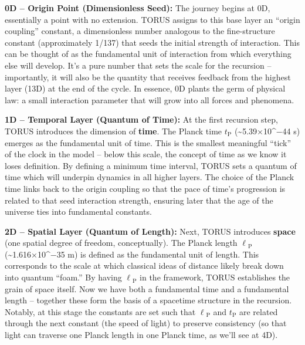 \documentclass[]{article}
\newcommand{\subscript}[1]{\ensuremath{_{\mathrm{#1}}}}
\begin{document}
\textbf{0D -- Origin Point (Dimensionless Seed):} The journey begins at
0D, essentially a point with no extension. TORUS assigns to this base
layer an ``origin coupling'' constant, a dimensionless number analogous
to the fine-structure constant (approximately 1/137) that seeds the
initial strength of interaction. This can be thought of as the
fundamental unit of interaction from which everything else will develop.
It's a pure number that sets the scale for the recursion -- importantly,
it will also be the quantity that receives feedback from the highest
layer (13D) at the end of the cycle. In essence, 0D plants the germ of
physical law: a small interaction parameter that will grow into all
forces and phenomena.

\textbf{1D -- Temporal Layer (Quantum of Time):} At the first recursion
step, TORUS introduces the dimension of \textbf{time}. The Planck time
$t\subscript{P}$ (\textasciitilde{}5.39×10\^{}−44 s) emerges as the fundamental unit of
time. This is the smallest meaningful ``tick'' of the clock in the model
-- below this scale, the concept of time as we know it loses definition.
By defining a minimum time interval, TORUS sets a quantum of time which
will underpin dynamics in all higher layers. The choice of the Planck
time links back to the origin coupling so that the pace of time's
progression is related to that seed interaction strength, ensuring later
that the age of the universe ties into fundamental constants.

\textbf{2D -- Spatial Layer (Quantum of Length):} Next, TORUS introduces
\textbf{space} (one spatial degree of freedom, conceptually). The Planck
length
$\ell\subscript{P}$ (\textasciitilde{}1.616×10\^{}−35 m) is defined as the fundamental unit
of length. This corresponds to the scale at which classical ideas of
distance likely break down into quantum ``foam.'' By having
$\ell\subscript{P}$ in
the framework, TORUS establishes the grain of space itself. Now we have
both a fundamental time and a fundamental length -- together these form
the basis of a spacetime structure in the recursion. Notably, at this
stage the constants are set such that
$\ell\subscript{P}$ and
$t\subscript{P}$ are
related through the next constant (the speed of light) to preserve
consistency (so that light can traverse one Planck length in one Planck
time, as we'll see at 4D).
\end{document}

